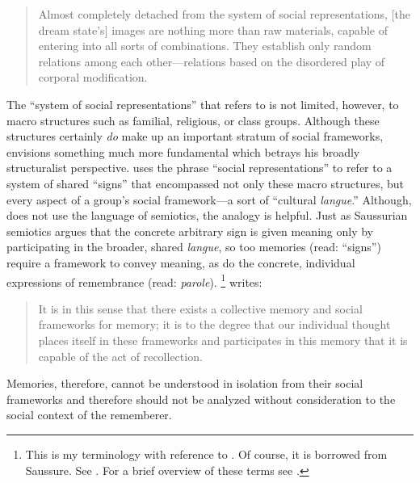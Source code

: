 \begin{quote}
    Almost completely detached from the system of social representations, {[}the dream state's{]} images are nothing more than raw materials, capable of entering into all sorts of combinations. They establish only random relations among each other---relations based on the disordered play of corporal modification.\autocite[42]{halbwachs1992}
\end{quote}  

The ``system of social representations'' that \halbwachs refers to is not limited, however, to macro structures such as familial, religious, or class groups. Although these structures certainly \emph{do} make up an important stratum of social frameworks, \halbwachs envisions something much more fundamental which betrays his broadly structuralist perspective. \halbwachs uses the phrase ``social representations'' to refer to a system of shared ``signs'' that encompassed not only these macro structures, but every aspect of a group's social framework---a sort of ``cultural \emph{langue}.'' Although, \halbwachs does not use the language of semiotics, the analogy is helpful. Just as Saussurian semiotics argues that the concrete arbitrary sign is given meaning only by participating in the broader, shared \emph{langue}, so too memories (read: ``signs'') require a framework to convey meaning, as do the concrete, individual expressions of remembrance (read: \emph{parole}).%
%
\footnote{This is my terminology with reference to \halbwachs. Of course, it is borrowed from Saussure. See \cite*{saussure1916}. For a brief overview of these terms see \cite[93--94]{smith-riley2009}.}
%
\halbwachs writes:  

\begin{quote}
    It is in this sense that there exists a collective memory and social frameworks for memory; it is to the degree that our individual thought places itself in these frameworks and participates in this memory that it is capable of the act of recollection.\autocite[38]{halbwachs1992}
\end{quote}  

Memories, therefore, cannot be understood in isolation from their social frameworks and therefore should not be analyzed without consideration to the social context of the rememberer.  

